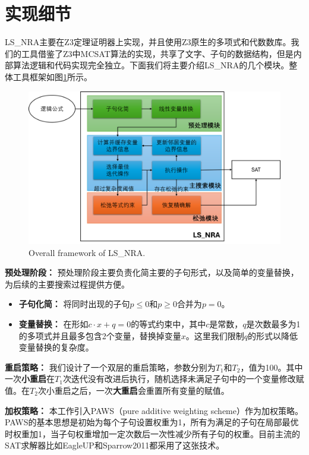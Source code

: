 \section{实现细节}
LS\_NRA主要在Z3定理证明器上实现，并且使用Z3原生的多项式和代数数库。我们的工具借鉴了Z3中MCSAT算法的实现，共享了文字、子句的数据结构，但是内部算法逻辑和代码实现完全独立。下面我们将主要介绍LS\_NRA的几个模块。整体工具框架如图\ref{fig:total}所示。

\begin{figure}[]
    \centering
    \includegraphics[width=0.9\columnwidth]{Img/structure.png}
     {Overall framework of LS\_NRA.}
    \label{fig:total}
\end{figure}

\textbf{预处理阶段：} 预处理阶段主要负责化简主要的子句形式，以及简单的变量替换，为后续的主要搜索过程提供方便。
\begin{itemize}
    \item \textbf{子句化简：} 将同时出现的子句$p \le 0$和$p \ge 0$合并为$p = 0$。
    \item \textbf{变量替换：} 在形如$c \cdot x + q = 0$的等式约束中，其中$c$是常数，$q$是次数最多为1的多项式并且最多包含2个变量，替换掉变量$x$。这里我们限制$q$的形式以降低变量替换的复杂度。
\end{itemize}

\textbf{重启策略：} 我们设计了一个双层的重启策略，参数分别为$T_1$和$T_2$，值为100。其中一次\textbf{小重启}在$T_1$次迭代没有改进后执行，随机选择未满足子句中的一个变量修改赋值。在$T_2$次小重启之后，一次\textbf{大重启}会重置所有变量的赋值。

\textbf{加权策略：} 本工作引入PAWS（pure additive weighting scheme）\cite{PAWS}作为加权策略。PAWS的基本思想是初始为每个子句设置权重为1，所有为满足的子句在局部最优时权重加1，当子句权重增加一定次数后一次性减少所有子句的权重。目前主流的SAT求解器比如EagleUP\cite{eagleup}和Sparrow2011\cite{sparrow}都采用了这张技术。

